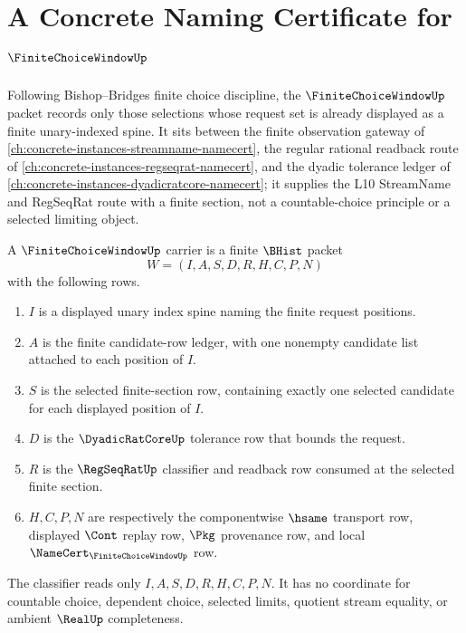 \chapter{A Concrete Naming Certificate for $\FiniteChoiceWindowUp$}
\label{ch:concrete-instances-finite-choice-window-namecert}

Following Bishop--Bridges finite choice discipline, the $\FiniteChoiceWindowUp$ packet records only those selections whose request set is already displayed as a finite unary-indexed spine. It sits between the finite observation gateway of \autoref{ch:concrete-instances-streamname-namecert}, the regular rational readback route of \autoref{ch:concrete-instances-regseqrat-namecert}, and the dyadic tolerance ledger of \autoref{ch:concrete-instances-dyadicratcore-namecert}; it supplies the L10 StreamName and RegSeqRat route with a finite section, not a countable-choice principle or a selected limiting object.

\begin{definition}
\label{def:finite-choice-window-carrier}
A $\FiniteChoiceWindowUp$ carrier is a finite $\BHist$ packet
$$
W=(I,A,S,D,R,H,C,P,N)
$$
with the following rows.
\begin{enumerate}
\item $I$ is a displayed unary index spine naming the finite request positions.
\item $A$ is the finite candidate-row ledger, with one nonempty candidate list attached to each position of $I$.
\item $S$ is the selected finite-section row, containing exactly one selected candidate for each displayed position of $I$.
\item $D$ is the $\DyadicRatCoreUp$ tolerance row that bounds the request.
\item $R$ is the $\RegSeqRatUp$ classifier and readback row consumed at the selected finite section.
\item $H,C,P,N$ are respectively the componentwise $\hsame$ transport row, displayed $\Cont$ replay row, $\Pkg$ provenance row, and local $\NameCert_{\FiniteChoiceWindowUp}$ row.
\end{enumerate}
The classifier reads only $I,A,S,D,R,H,C,P,N$. It has no coordinate for countable choice, dependent choice, selected limits, quotient stream equality, or ambient $\RealUp$ completeness.
\end{definition}

